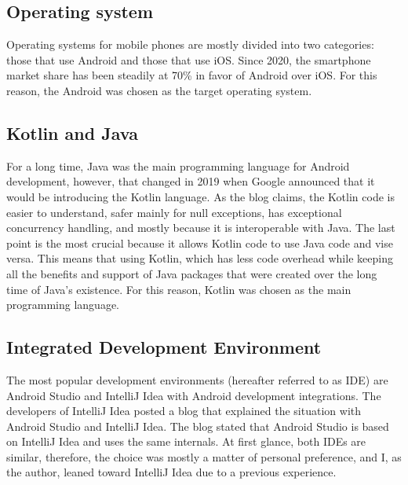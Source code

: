 \subsection{Operating system}
Operating systems for mobile phones are mostly divided into two categories: those that use Android and those that use iOS. Since 2020, the smartphone market share has been steadily at 70\% \cite{phoneOsStatistics} in favor of Android over iOS. For this reason, the Android was chosen as the target operating system.


\subsection{Kotlin and Java}

For a long time, Java was the main programming language for Android development, however, that changed in 2019 \cite{androidKotlinBlog} when Google announced that it would be introducing the Kotlin language. As the blog claims, the Kotlin code is easier to understand, safer mainly for null exceptions, has exceptional concurrency handling, and mostly because it is interoperable with Java. The last point is the most crucial because it allows Kotlin code to use Java code and vise versa. This means that using Kotlin, which has less code overhead while keeping all the benefits and support of Java packages that were created over the long time of Java's existence. For this reason, Kotlin was chosen as the main programming language.


\subsection{Integrated Development Environment}
The most popular development environments (hereafter referred to as IDE) are Android Studio and IntelliJ Idea with Android development integrations. The developers of IntelliJ Idea posted a blog \cite{androidStudioAndIdea}
that explained the situation with Android Studio and IntelliJ Idea. The blog stated that Android Studio is based on IntelliJ Idea and uses the same internals. At first glance, both IDEs are similar, therefore, the choice was mostly a matter of personal preference, and I, as the author, leaned toward IntelliJ Idea due to a previous experience.




